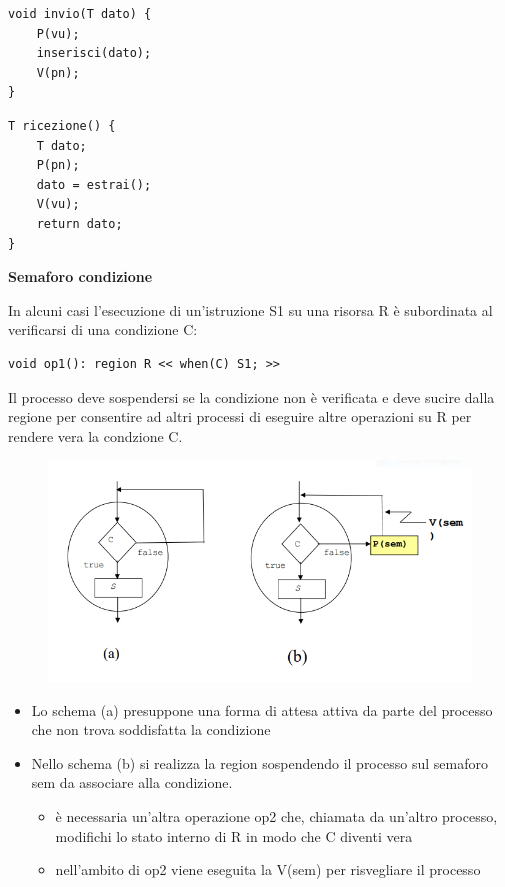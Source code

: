 \documentclass{article}
\begin{document}
\noindent\begin{minipage}{.45\columnwidth}
    \begin{lstlisting}
void invio(T dato) {
    P(vu);
    inserisci(dato);
    V(pn);
}
    \end{lstlisting}
\end{minipage}\hfill
\begin{minipage}{.45\columnwidth}
    \begin{lstlisting}
T ricezione() {
    T dato;
    P(pn);
    dato = estrai();
    V(vu);
    return dato;
}
    \end{lstlisting}
\end{minipage}

\vspace{5mm}
\textbf{Semaforo condizione}

\vspace{3mm}
In alcuni casi l'esecuzione di un'istruzione S1 su una risorsa R è subordinata al verificarsi di una condizione C:

\begin{lstlisting}
void op1(): region R << when(C) S1; >>
\end{lstlisting}

\vspace{3mm}
Il processo deve sospendersi se la condizione non è verificata e deve sucire dalla regione per consentire ad altri processi di eseguire altre operazioni su R
per rendere vera la condzione C.

\begin{figure}[htbp]
    \centering
    \includegraphics[width=0.70\columnwidth]{imgs/schema_condizione.PNG}
\end{figure}

\begin{itemize}
    \item Lo schema (a) presuppone una forma di attesa attiva da parte del processo che non trova soddisfatta la condizione
    \item Nello schema (b) si realizza la region sospendendo il processo sul semaforo sem da associare alla condizione.
    \begin{itemize}
        \item è necessaria un'altra operazione op2 che, chiamata da un'altro processo, modifichi lo stato interno di R in modo che C diventi vera
        \item nell'ambito di op2 viene eseguita la V(sem) per risvegliare il processo
    \end{itemize}
\end{itemize}
\end{document}
